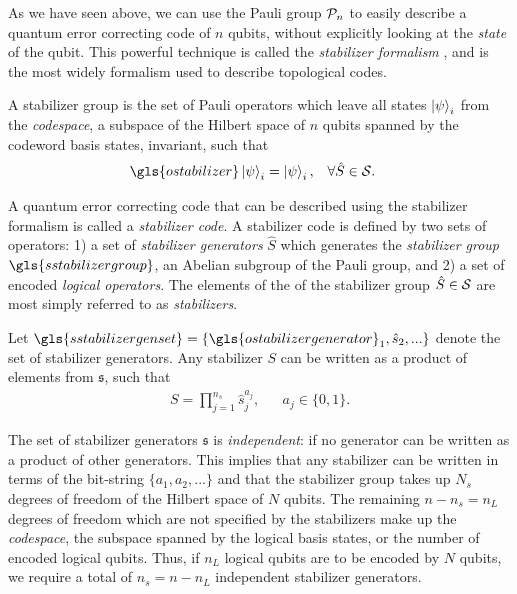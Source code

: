 As we have seen above, we can use the Pauli group $\mathcal{P}_n$ to easily describe a quantum error correcting code of $n$ qubits, without explicitly looking at the \emph{state} of the qubit. This powerful technique is called the \emph{stabilizer formalism} \cite{gottesman1997stabilizer}, and is the most widely formalism used to describe topological codes.

\begin{definition}\label{def:stabilizer}
  A stabilizer group is the set of Pauli operators which leave all states $\ket{\psi}_i$ from the \emph{codespace}, a subspace of the Hilbert space of $n$ qubits spanned by the codeword basis states, invariant, such that
\begin{align}
  & \gls{ostabilizer}\ket{\psi}_i = \ket{\psi}_i, && \forall \hat{S} \in \m{S}. &
\end{align}
\end{definition}
A quantum error correcting code that can be described using the stabilizer formalism is called a \emph{stabilizer code}. A stabilizer code is defined by two sets of operators: 1) a set of \emph{stabilizer generators} $\hat{S}$ which generates the \emph{stabilizer group} $\gls{sstabilizergroup}$, an Abelian subgroup of the Pauli group, and 2) a set of encoded \emph{logical operators}. The elements of the of the stabilizer group $\hat{S}\in\mathcal{S}$ are most simply referred to as \emph{stabilizers}. 
\begin{definition}\label{def:stabilizergen}
  Let $\gls{sstabilizergenset}=\{\gls{ostabilizergenerator}_1,\hat{s}_2,...\}$ denote the set of stabilizer generators. Any stabilizer $S$ can be written as a product of elements from $\mathfrak{s}$, such that 
  \begin{align}
  & S = \prod_{j=1}^{n_s}\hat{s}_j^{a_j}, && a_j \in \{0, 1\}. &
  \end{align}
\end{definition}
The set of stabilizer generators $\mathfrak{s}$ is \emph{independent}: if no generator can be written as a product of other generators. This implies that any stabilizer can be written in terms of the bit-string $\{a_1, a_2, ...\}$ and that the stabilizer group takes up $N_s$ degrees of freedom of the Hilbert space of $N$ qubits. The remaining $n-n_s = n_L$ degrees of freedom which are not specified by the stabilizers make up the \emph{codespace}, the subspace spanned by the logical basis states, or the number of encoded logical qubits. Thus, if $n_L$ logical qubits are to be encoded by $N$ qubits, we require a total of $n_s= n-n_L$ independent stabilizer generators.


